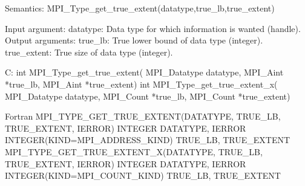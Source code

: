 Semantics:
MPI_Type_get_true_extent(datatype,true_lb,true_extent)

Input argument:
datatype: Data type for which information is wanted (handle).
Output arguments:
true_lb: True lower bound of data type (integer).
true_extent: True size of data type (integer).

C:
int MPI_Type_get_true_extent(
    MPI_Datatype datatype,
    MPI_Aint *true_lb, MPI_Aint *true_extent)
int MPI_Type_get_true_extent_x(
    MPI_Datatype datatype,
    MPI_Count *true_lb, MPI_Count *true_extent)

Fortran
MPI_TYPE_GET_TRUE_EXTENT(DATATYPE, TRUE_LB, TRUE_EXTENT, IERROR)
    INTEGER    DATATYPE, IERROR
    INTEGER(KIND=MPI_ADDRESS_KIND) TRUE_LB, TRUE_EXTENT
MPI_TYPE_GET_TRUE_EXTENT_X(DATATYPE, TRUE_LB, TRUE_EXTENT, IERROR)
    INTEGER    DATATYPE, IERROR
    INTEGER(KIND=MPI_COUNT_KIND) TRUE_LB, TRUE_EXTENT


